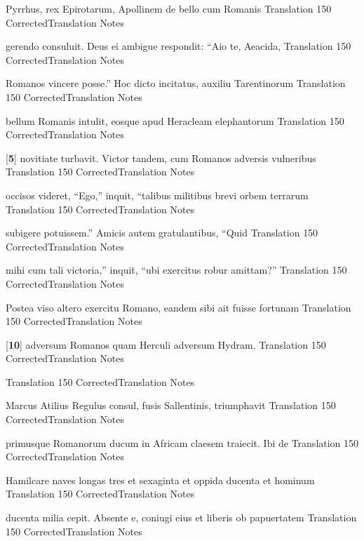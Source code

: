 \latline
  {Pyrrhus, rex Epirotarum, Apollinem de bello cum Romanis}
  { Translation }
  {150}
  { CorrectedTranslation }
  { Notes }


\latline
  {gerendo consuluit.  Deus ei ambigue respondit:  ``Aio te, Aeacida,}
  { Translation }
  {150}
  { CorrectedTranslation }
  { Notes }


\latline
  {Romanos vincere posse.''  Hoc dicto incitatus, auxiliu Tarentinorum}
  { Translation }
  {150}
  { CorrectedTranslation }
  { Notes }


\latline
  {bellum Romanis intulit, eosque apud Heracleam elephantorum}
  { Translation }
  {150}
  { CorrectedTranslation }
  { Notes }


\latline
  {[\textbf{5}] novitiate turbavit.  Victor tandem, cum Romanos adversis vulneribus}
  { Translation }
  {150}
  { CorrectedTranslation }
  { Notes }


\latline
  {occisos videret, ``Ego,'' inquit, ``talibus militibus brevi orbem terrarum}
  { Translation }
  {150}
  { CorrectedTranslation }
  { Notes }


\latline
  {subigere potuissem.''  Amicis autem gratulantibus, ``Quid}
  { Translation }
  {150}
  { CorrectedTranslation }
  { Notes }


\latline
  {mihi cum tali victoria,'' inquit, ``ubi exercitus robur amittam?''}
  { Translation }
  {150}
  { CorrectedTranslation }
  { Notes }


\latline
  {Postea viso altero exercitu Romano, eandem sibi ait fuisse fortunam}
  { Translation }
  {150}
  { CorrectedTranslation }
  { Notes }


\latline
  {[\textbf{10}] adversum Romanos quam Herculi adversum Hydram.}
  { Translation }
  {150}
  { CorrectedTranslation }
  { Notes }


\latline
  {}
  { Translation }
  {150}
  { CorrectedTranslation }
  { Notes }


\latline
  {Marcus Atilius Regulus consul, fusis Sallentinis, triumphavit}
  { Translation }
  {150}
  { CorrectedTranslation }
  { Notes }


\latline
  {primusque Romanorum ducum in Africam claesem traiecit.  Ibi de }
  { Translation }
  {150}
  { CorrectedTranslation }
  { Notes }


\latline
  {Hamilcare naves longas tres et sexaginta et oppida ducenta et hominum}
  { Translation }
  {150}
  { CorrectedTranslation }
  { Notes }


\latline
  {ducenta milia cepit.  Absente e, coniugi eius et liberis ob papuertatem}
  { Translation }
  {150}
  { CorrectedTranslation }
  { Notes }


